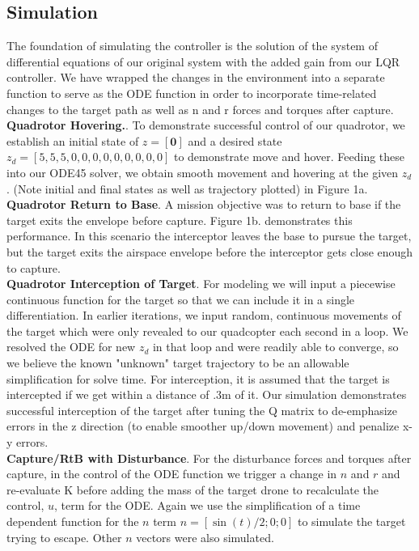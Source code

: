 \documentclass{article}
\begin{document}
\begin{multicols}{2}
\section*{Simulation}
\noindent
The foundation of simulating the controller is the solution of the system of differential equations of our original system with the added 
gain from our LQR controller.  We have wrapped the changes in the environment into a separate function to serve as the ODE 
function in order to incorporate time-related changes to the target path as well as n and r forces and torques after capture.\\
\textbf{Quadrotor Hovering.}. To demonstrate successful control of our quadrotor, we establish an initial state of $z=[\mathbf{0}]$ and 
a desired state $z_d=[5,5,5,0,0,0,0,0,0,0,0,0] $ to demonstrate move and hover.  Feeding these into our ODE45 solver, we obtain 
smooth movement and hovering at the given $z_d$.  (Note initial and final states as well as trajectory plotted) in Figure 1a.\\
\textbf{Quadrotor Return to Base}. A mission objective was to return to base if the target exits the envelope before capture.  
Figure 1b. demonstrates this performance. In this scenario the interceptor leaves the base to pursue the target, but the target exits 
the airspace envelope before the interceptor gets close enough to capture.\\
\textbf{Quadrotor Interception of Target}. For modeling we will input a piecewise continuous function for the target so that we can 
include it in a single differentiation.  In earlier iterations, we input random, continuous movements of the target which were only 
revealed to our quadcopter each second in a loop.  We resolved the ODE for new $z_d$ in that loop and were readily able to converge, so we believe the known "unknown" target trajectory to be an allowable simplification for solve time.
For interception, it is assumed that the target is intercepted if we get within a distance of .3m of it.   Our simulation demonstrates 
successful interception of the target after tuning the Q matrix to de-emphasize errors in the z direction (to enable smoother up/down 
movement) and penalize x-y errors.  \\
\textbf{Capture/RtB with Disturbance}.  For the disturbance forces and torques after capture,  in the control of the ODE function we trigger a change in $n$ and $r$ and re-evaluate K before adding the mass of the target drone to recalculate the control, $u$, term for the ODE.  Again we use the simplification of a time dependent function for the $n$ term $n=[\sin(t)/2; 0; 0]$ to simulate the target trying to escape.  Other $n$ vectors were also simulated.\\

\end{multicols}
\end{document}
